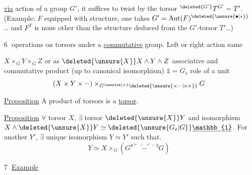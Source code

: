 \uline{via} action of a group $G'$, it suffices to twist by the torsor ${}^{\deleted{G'}}T^{G'}=T'$. (Example:  $F$ equipped with  structure,  one takes $G'=\operatorname{Aut}(F)^{\deleted{\unsure{\bullet|\ast}}}$\ldots{} and $F^T$ is none other  than the structure deduced from the $G'$-torsor $T'$\ldots)

\textcircled{6}  operations on torsors under a \uline{commutative} group. Left or right action same

$X\times_G Y\times_G Z$ or as $\deleted{\unsure{X}}X\wedge Y\wedge Z$ associative and commutative product (up to canonical isomorphism) $\mathbb{1}=G_s$  role of a unit
\[
 (X\times Y\times-)\times_{G^{\inserted{n}}\deleted{\unsure{\times\cdots|n\times}}}G
\]

\uline{Proposition} A product of torsors is a \uline{torsor}.


\uline{Proposition} $\forall$ torsor $X$, $\exists$ torsor $\deleted{\unsure{X}}Y$ and isomorphism $X\wedge\deleted{\unsure{X}}Y\simeq\deleted{\unsure{G_s|G}}\underline{\mathbb{1}}$. For another $Y'$, $\exists$ unique isomorphism $Y\simeq Y'$ such that.
\[
 Y\simeq X\times_G(G\overset{g\mathrel{\vdash\!-\!\dashv}-g}{\mathrel{-}}G)
\]

\textcircled{7} \uline{Example}  


